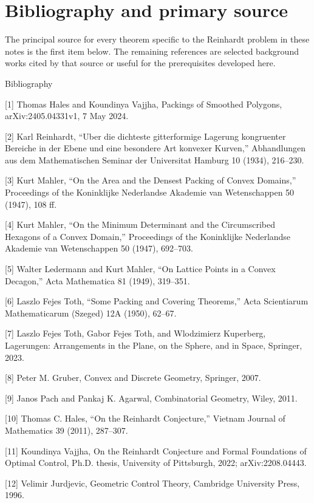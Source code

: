 \chapter*{Bibliography and primary source}
The principal source for every theorem specific to the Reinhardt problem in these notes is the first item below. The remaining references are selected background works cited by that source or useful for the prerequisites developed here.


Bibliography


[1] Thomas Hales and Koundinya Vajjha, Packings of Smoothed Polygons, arXiv:2405.04331v1, 7 May 2024.


[2] Karl Reinhardt, “Uber die dichteste gitterformige Lagerung kongruenter Bereiche in der Ebene und eine besondere Art konvexer Kurven,” Abhandlungen aus dem Mathematischen Seminar der Universitat Hamburg 10 (1934), 216–230.


[3] Kurt Mahler, “On the Area and the Densest Packing of Convex Domains,” Proceedings of the Koninklijke Nederlandse Akademie van Wetenschappen 50 (1947), 108 ff.


[4] Kurt Mahler, “On the Minimum Determinant and the Circumscribed Hexagons of a Convex Domain,” Proceedings of the Koninklijke Nederlandse Akademie van Wetenschappen 50 (1947), 692–703.


[5] Walter Ledermann and Kurt Mahler, “On Lattice Points in a Convex Decagon,” Acta Mathematica 81 (1949), 319–351.


[6] Laszlo Fejes Toth, “Some Packing and Covering Theorems,” Acta Scientiarum Mathematicarum (Szeged) 12A (1950), 62–67.


[7] Laszlo Fejes Toth, Gabor Fejes Toth, and Wlodzimierz Kuperberg, Lagerungen: Arrangements in the Plane, on the Sphere, and in Space, Springer, 2023.


[8] Peter M. Gruber, Convex and Discrete Geometry, Springer, 2007.


[9] Janos Pach and Pankaj K. Agarwal, Combinatorial Geometry, Wiley, 2011.


[10] Thomas C. Hales, “On the Reinhardt Conjecture,” Vietnam Journal of Mathematics 39 (2011), 287–307.


[11] Koundinya Vajjha, On the Reinhardt Conjecture and Formal Foundations of Optimal Control, Ph.D. thesis, University of Pittsburgh, 2022; arXiv:2208.04443.


[12] Velimir Jurdjevic, Geometric Control Theory, Cambridge University Press, 1996.



